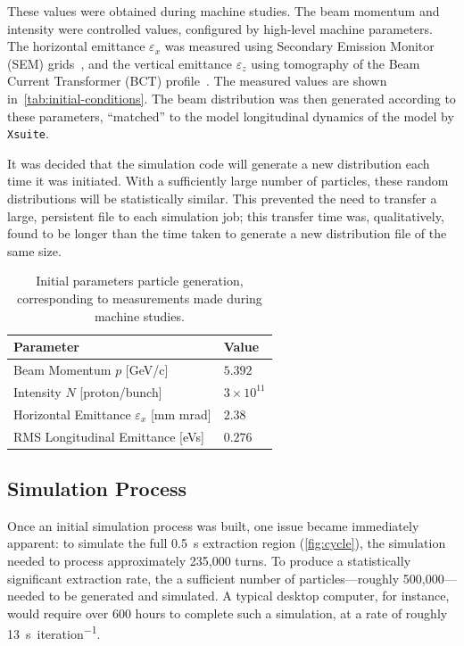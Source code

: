 \documentclass[11pt]{report}
\begin{document}
These values were obtained during machine studies. The beam momentum and intensity were controlled values, configured by high-level machine parameters. The horizontal emittance $\varepsilon_x$ was measured using Secondary Emission Monitor (SEM) grids~\cite{Martini:324553}, and the vertical emittance $\varepsilon_z$ using tomography of the Beam Current Transformer (BCT) profile~\cite{Hancock:960231}. The measured values are shown in~\autoref{tab:initial-conditions}. The beam distribution was then generated according to these parameters, ``matched'' to the model longitudinal dynamics of the model by \verb|Xsuite|.

It was decided that the simulation code will generate a new distribution each time it was initiated. With a sufficiently large number of particles, these random distributions will be statistically similar. This prevented the need to transfer a large, persistent file to each simulation job; this transfer time was, qualitatively, found to be longer than the time taken to generate a new distribution file of the same size.

\begin{table}[]
  \centering
  \begin{tabular}{ll}
    \centering
  Parameter                                       & Value \\ \hline \hline
  Beam Momentum $p$ [GeV/c]                       & $5.392$ \\
  Intensity $N$ [proton/bunch]                    & $3\times10^{11}$ \\
  Horizontal Emittance $\varepsilon_x$ [mm mrad]  & $2.38$ \\
  RMS Longitudinal Emittance [eVs]                & $0.276$
  \end{tabular}
  \caption{Initial parameters particle generation, corresponding to measurements made during machine studies.}\label{tab:initial-conditions}
\end{table}

\subsection{Simulation Process}\label{sec:sim_process}

Once an initial simulation process was built, one issue became immediately apparent: to simulate the full \qty{0.5}{\second} extraction region (\autoref{fig:cycle}), the simulation needed to process approximately 235,000 turns. To produce a statistically significant extraction rate, the a sufficient number of particles---roughly 500,000---needed to be generated and simulated. A typical desktop computer, for instance, would require over 600 hours to complete such a simulation, at a rate of roughly \qty{13}{\second\per iteration}.
\end{document}
